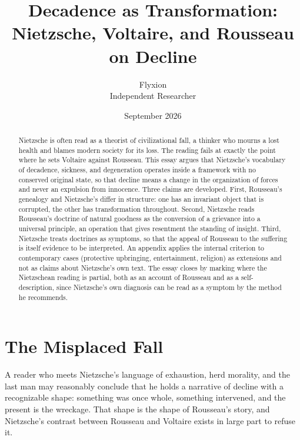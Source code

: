 \documentclass[11pt]{article}
\title{Decadence as Transformation:\\Nietzsche, Voltaire, and Rousseau on Decline}
\author{Flyxion\\\small Independent Researcher}
\date{September 2026}
\theoremstyle{definition}
\begin{document}
\maketitle

\begin{abstract}
\noindent Nietzsche is often read as a theorist of civilizational fall, a thinker who mourns a lost health and blames modern society for its loss. The reading fails at exactly the point where he sets Voltaire against Rousseau. This essay argues that Nietzsche's vocabulary of decadence, sickness, and degeneration operates inside a framework with no conserved original state, so that decline means a change in the organization of forces and never an expulsion from innocence. Three claims are developed. First, Rousseau's genealogy and Nietzsche's differ in structure: one has an invariant object that is corrupted, the other has transformation throughout. Second, Nietzsche reads Rousseau's doctrine of natural goodness as the conversion of a grievance into a universal principle, an operation that gives resentment the standing of insight. Third, Nietzsche treats doctrines as symptoms, so that the appeal of Rousseau to the suffering is itself evidence to be interpreted. An appendix applies the internal criterion to contemporary cases (protective upbringing, entertainment, religion) as extensions and not as claims about Nietzsche's own text. The essay closes by marking where the Nietzschean reading is partial, both as an account of Rousseau and as a self-description, since Nietzsche's own diagnosis can be read as a symptom by the method he recommends.
\end{abstract}

\section{The Misplaced Fall}

A reader who meets Nietzsche's language of exhaustion, herd morality, and the last man may reasonably conclude that he holds a narrative of decline with a recognizable shape: something was once whole, something intervened, and the present is the wreckage. That shape is the shape of Rousseau's story, and Nietzsche's contrast between Rousseau and Voltaire exists in large part to refuse it.
\end{document}

